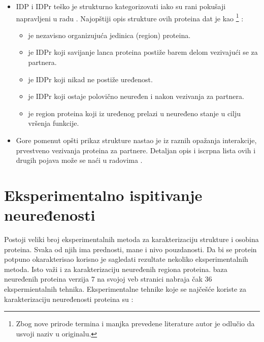 \begin{itemize}
  \item 
    IDP i IDPr teško je strukturno kategorizovati \parencite{oldfield2014,
      dunker2001} iako su rani pokušaji napravljeni u radu \parencite{dunker2001}.
      Najopštiji opis strukture ovih proteina dat je kao
      \footnote{ Zbog nove
        prirode termina i manjka prevedene literature autor je odlučio da
      usvoji naziv u originalu.} \parencite{uversky2016}:
    \begin{itemize}
      \item {}  je nezavisno organizujuća jedinica (region) proteina.
      \item {}  je IDPr koji savijanje lanca proteina postiže barem delom vezivajući se za partnera. 
      \item {}  je IDPr koji nikad ne postiže uređenost.
      \item {}  je IDPr koji ostaje polovično neuređen i nakon vezivanja za partnera.
      \item {}  je region proteina koji iz uređenog prelazi u neuređeno stanje u cilju vršenja funkcije.
    \end{itemize}

  \item 
    Gore pomenut opšti prikaz strukture nastao je iz raznih opažanja
    interakcije, prvestveno vezivanja proteina za partnere.
    Detaljan opis i iscrpna lista ovih i drugih pojava može se naći u radovima
    \cite{uversky2016, a2z,  Tompa2009}.

\end{itemize}

\section{Eksperimentalno ispitivanje neuređenosti}

Postoji veliki broj eksperimentalnih metoda za karakterizaciju strukture i
osobina proteina.  Svaka od njih ima prednosti, mane i nivo pouzdanosti. Da bi
se protein potpuno okarakterisao korisno je sagledati rezultate nekoliko
eksperimentalnih metoda. Isto važi i za karakterizaciju neuređenih regiona
proteina. \textit{} \cite{Piovesan2016} baza neuređenih
proteina verzija 7 na svojoj veb stranici nabraja čak 36 ekspermientalnih
tehnika.  Eksperimentalne tehnike koje se najčešće koriste za karakterizaciju
neuređenosti proteina su \cite{dunker2001}: 

